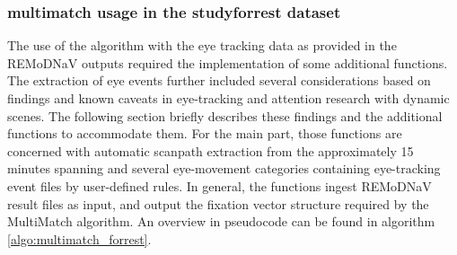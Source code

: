 \documentclass[a4paper, 12pt]{scrreprt}
\begin{document}
\subsubsection{multimatch usage in the studyforrest dataset}
The use of the algorithm with the eye tracking data as provided in the REMoDNaV outputs required the implementation of some additional functions.
The extraction of eye events further included several considerations based on findings and known caveats in eye-tracking and attention research with dynamic scenes. The following section briefly describes these findings and the additional functions to accommodate them. For the main part, those functions are concerned with automatic scanpath extraction from the approximately 15 minutes spanning and several eye-movement categories containing eye-tracking event files by user-defined rules. In general, the functions ingest REMoDNaV result files as input, and output the fixation vector structure required by the MultiMatch algorithm. An overview in pseudocode can be found in algorithm \ref{algo:multimatch_forrest}. \newline
\end{document}
